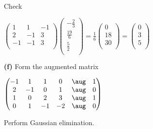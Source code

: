 \documentclass[oneside,12pt]{amsart}
\begin{document}
\bigskip

Check

\bigskip

$
\begin{pmatrix}
 1  &  1 &  -1  \\
 2  & -1 &   3  \\
-1  & -1 &   3  \\
\end{pmatrix}
\begin{pmatrix}
-\frac{2}{3} \\[6pt]
\frac{19}{6}\\[6pt]
\frac{5}{2}\\[6pt]
\end{pmatrix}
=
\frac{1}{6}
\begin{pmatrix}
0\\[6pt]
18\\[6pt]
30\\[6pt]
\end{pmatrix}
=
\begin{pmatrix}
0 \\[6pt]
3\\[6pt]
5 \\[6pt]
\end{pmatrix}
$

\bigskip


\textbf{(f)} Form the augmented matrix

$
\begin{pmatrix}
 -1  &  1 &  1 &  0 & \aug &  1  \\
  2  & -1 &  0 &  1 & \aug &  0  \\
  1  &  0 &  2 &  3 & \aug &  1  \\
  0  &  1 & -1 & -2 & \aug &  0  \\
\end{pmatrix}
$

Perform Gaussian elimination.

\bigskip
\end{document}
